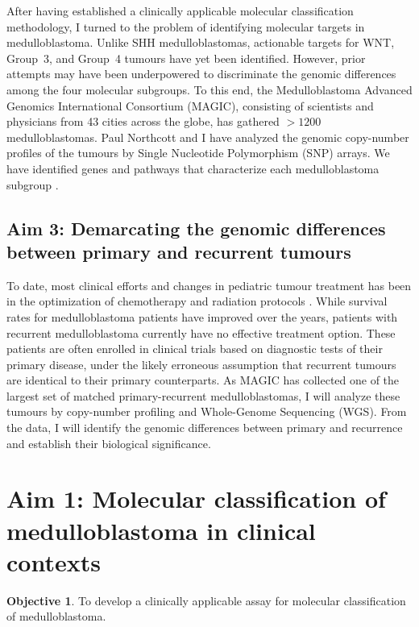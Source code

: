 \documentclass[11pt,letterpaper]{article}
\theoremstyle{definition}
\newtheorem*{objective}{Objective}
\begin{document}
After having established a clinically applicable molecular classification methodology, I turned to the problem of identifying molecular targets in medulloblastoma. Unlike SHH medulloblastomas, actionable targets for WNT, Group~3, and Group~4 tumours have yet been identified. However, prior attempts may have been underpowered to discriminate the genomic differences among the four molecular subgroups. To this end, the Medulloblastoma Advanced Genomics International Consortium (MAGIC), consisting of scientists and physicians from 43 cities across the globe, has gathered $>1200$ medulloblastomas. Paul Northcott and I have analyzed the genomic copy-number profiles of the tumours by Single Nucleotide Polymorphism (SNP) arrays. We have identified genes and pathways that characterize each medulloblastoma subgroup .

\subsection{Aim 3: Demarcating the genomic differences between primary and recurrent tumours}

To date, most clinical efforts and changes in pediatric tumour treatment has been in the optimization of chemotherapy and radiation protocols . While survival rates for medulloblastoma patients have improved over the years, patients with recurrent medulloblastoma currently have no effective treatment option. These patients are often enrolled in clinical trials based on diagnostic tests of their primary disease, under the likely erroneous assumption that recurrent tumours are identical to their primary counterparts. As MAGIC has collected one of the largest set of matched primary-recurrent medulloblastomas, I will analyze these tumours by copy-number profiling and Whole-Genome Sequencing (WGS). From the data, I will identify the genomic differences between primary and recurrence and establish their biological significance.




\section{Aim 1: Molecular classification of medulloblastoma in clinical contexts}

\begin{objective}
To develop a clinically applicable assay for molecular classification of medulloblastoma.
\end{objective}
\end{document}
